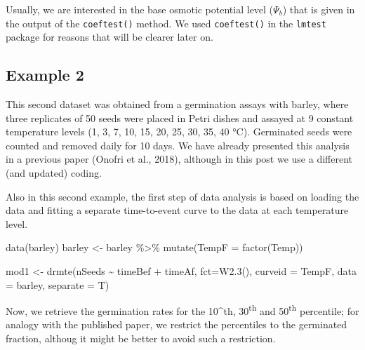 \documentclass[
]{book}
\newenvironment{Shaded}{\begin{snugshade}}{\end{snugshade}}
\newcommand{\AttributeTok}[1]{\textcolor[rgb]{0.77,0.63,0.00}{#1}}
\newcommand{\FunctionTok}[1]{\textcolor[rgb]{0.00,0.00,0.00}{#1}}
\newcommand{\NormalTok}[1]{#1}
\newcommand{\OtherTok}[1]{\textcolor[rgb]{0.56,0.35,0.01}{#1}}
\newcommand{\SpecialCharTok}[1]{\textcolor[rgb]{0.00,0.00,0.00}{#1}}
\begin{document}
Usually, we are interested in the base osmotic potential level (\(\Psi_b\)) that is given in the output of the \texttt{coeftest()} method. We used \texttt{coeftest()} in the \texttt{lmtest} package for reasons that will be clearer later on.

\hypertarget{example-2}{%
\subsection{Example 2}\label{example-2}}

This second dataset was obtained from a germination assays with barley, where three replicates of 50 seeds were placed in Petri dishes and assayed at 9 constant temperature levels (1, 3, 7, 10, 15, 20, 25, 30, 35, 40 °C). Germinated seeds were counted and removed daily for 10 days. We have already presented this analysis in a previous paper (Onofri et al., 2018), although in this post we use a different (and updated) coding.

Also in this second example, the first step of data analysis is based on loading the data and fitting a separate time-to-event curve to the data at each temperature level.

\begin{Shaded}
\begin{Highlighting}[]
\FunctionTok{data}\NormalTok{(barley)}
\NormalTok{barley }\OtherTok{\textless{}{-}}\NormalTok{ barley }\SpecialCharTok{\%\textgreater{}\%} 
  \FunctionTok{mutate}\NormalTok{(}\AttributeTok{TempF =} \FunctionTok{factor}\NormalTok{(Temp))}

\NormalTok{mod1 }\OtherTok{\textless{}{-}} \FunctionTok{drmte}\NormalTok{(nSeeds }\SpecialCharTok{\textasciitilde{}}\NormalTok{ timeBef }\SpecialCharTok{+}\NormalTok{ timeAf, }\AttributeTok{fct=}\FunctionTok{W2.3}\NormalTok{(),}
      \AttributeTok{curveid =}\NormalTok{ TempF,}
      \AttributeTok{data =}\NormalTok{ barley,}
      \AttributeTok{separate =}\NormalTok{ T)}
\end{Highlighting}
\end{Shaded}

Now, we retrieve the germination rates for the 10\^{}th, 30\textsuperscript{th} and 50\textsuperscript{th} percentile; for analogy with the published paper, we restrict the percentiles to the germinated fraction, althoug it might be better to avoid such a restriction.
\end{document}

